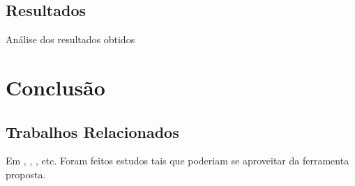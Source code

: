 \documentclass[a4paper,12pt]{article}
\numberwithin{figure}{section}
\begin{document}
\subsection{Resultados}%
Análise dos resultados obtidos

\newpage

\section{Conclusão}%


\subsection{Trabalhos Relacionados}%
Em \cite{Calciati}, \cite{WhoAdded}, \cite{YLyu}, etc. Foram feitos estudos tais que poderiam se aproveitar da ferramenta proposta.





\newpage
%


\nocite{developer}
\end{document}
